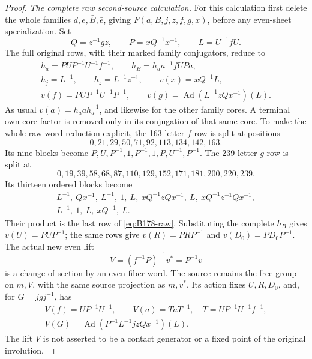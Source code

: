 \begin{proof}
\emph{The complete raw second-source calculation.}
For this calculation first delete the whole families
\(d,e,\bar B,\bar e\), giving \(F(a,B,j,z,f,g,x)\), before any
even-sheet specialization. Set
\[
 Q=z^{-1}gz,\qquad P=xQ^{-1}x^{-1},\qquad L=U^{-1}fU.
\]
The full original rows, with their marked family conjugators, reduce to
\begin{equation}\label{eq:B178-raw}
\begin{gathered}
 h_a=PUP^{-1}U^{-1}f^{-1},\qquad
 h_B=h_a a^{-1}fUPa,\\
 h_j=L^{-1},\qquad h_z=L^{-1}z^{-1},\qquad
 v(x)=xQ^{-1}L,\\
 v(f)=PUP^{-1}U^{-1}P^{-1},\qquad
 v(g)=\operatorname{Ad}(L^{-1}zQx^{-1})(L).
\end{gathered}
\end{equation}
As usual \(v(a)=h_aah_a^{-1}\), and likewise for the other family
cores. A terminal own-core factor is removed only in its conjugation
of that same core. To make the whole raw-word reduction explicit, the
163-letter \(f\)-row is split at positions
\[
 0,21,29,50,71,92,113,134,142,163.
\]
Its nine blocks become
\(P,U,P^{-1},1,P^{-1},1,P,U^{-1},P^{-1}\).
The 239-letter \(g\)-row is split at
\[
 0,19,39,58,68,87,110,129,152,171,181,200,220,239.
\]
Its thirteen ordered blocks become
\[
\begin{gathered}
 L^{-1},\ Qx^{-1},\ L^{-1},\ 1,\ L,\
 xQ^{-1}zQx^{-1},\ L,\ xQ^{-1}z^{-1}Qx^{-1},\\
 L^{-1},\ 1,\ L,\ xQ^{-1},\ L.
\end{gathered}
\]
Their product is the last row of \eqref{eq:B178-raw}.
Substituting the complete \(h_B\) gives \(v(U)=PUP^{-1}\);
the same rows give \(v(R)=PRP^{-1}\) and \(v(D_0)=PD_0P^{-1}\).
The actual new even lift
\[
                  V=(f^{-1}P)^{-1}v^*=P^{-1}v
\]
is a change of section by an even fiber word. The source remains the
free group on \(m,V\), with the same source projection as \(m,v^*\).
Its action fixes \(U,R,D_0\), and, for \(G=jgj^{-1}\), has
\begin{equation}\label{eq:B178-normalized-raw}
\begin{gathered}
 V(f)=UP^{-1}U^{-1},\qquad
 V(a)=TaT^{-1},\quad T=UP^{-1}U^{-1}f^{-1},\\
 V(G)=\operatorname{Ad}(P^{-1}L^{-1}jzQx^{-1})(L).
\end{gathered}
\end{equation}
The lift \(V\) is not asserted to be a contact generator or a fixed
point of the original involution.


\end{proof}
